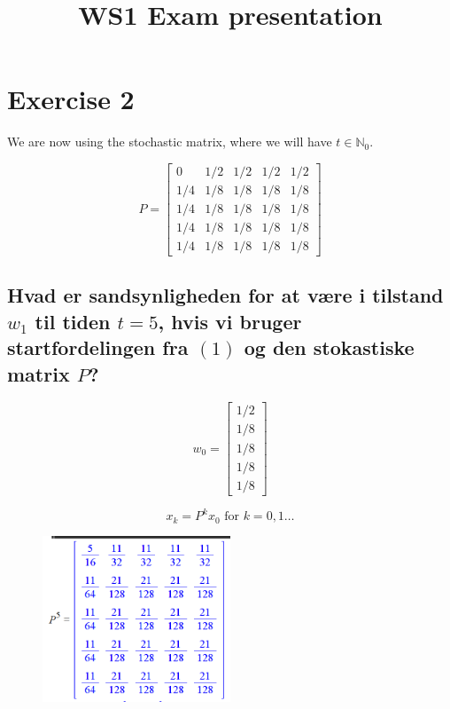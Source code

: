 \documentclass{article}
\title{WS1 Exam presentation}
\begin{document}
\section{Exercise 2}
We are now using the stochastic matrix, where we will have $t \in \mathbb{N}_0$.

\begin{equation}
    P =
    \begin{bmatrix}
    0 & 1/2 & 1/2 & 1/2 & 1/2 \\
    1/4 & 1/8 & 1/8 & 1/8 & 1/8 \\
    1/4 & 1/8 & 1/8 & 1/8 & 1/8 \\
    1/4 & 1/8 & 1/8 & 1/8 & 1/8 \\
    1/4 & 1/8 & 1/8 & 1/8 & 1/8
    \end{bmatrix}
\end{equation}

\subsection{Hvad er sandsynligheden for at v\ae re i tilstand $w_1$ til tiden $t=5$, hvis vi bruger startfordelingen fra $(1)$ og den stokastiske matrix $P$?}

\begin{equation}
    w_0 =
    \begin{bmatrix}
        1/2 \\
        1/8 \\
        1/8 \\
        1/8 \\
        1/8
    \end{bmatrix}
\end{equation}

\begin{equation}
    x_k = P^kx_0 \text{ for } k=0,1 \dots
\end{equation}

\begin{figure}[h]
    \centering
    \includegraphics[width = 0.5\textwidth]{p5}
\end{figure}
\end{document}
